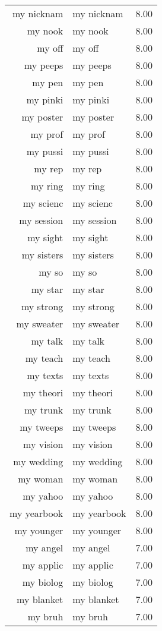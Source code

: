 \begin{table}[ht]
\begin{tabular}{rlr}
  my nicknam & my nicknam & 8.00 \\ 
  my nook & my nook & 8.00 \\ 
  my off & my off & 8.00 \\ 
  my peeps & my peeps & 8.00 \\ 
  my pen & my pen & 8.00 \\ 
  my pinki & my pinki & 8.00 \\ 
  my poster & my poster & 8.00 \\ 
  my prof & my prof & 8.00 \\ 
  my pussi & my pussi & 8.00 \\ 
  my rep & my rep & 8.00 \\ 
  my ring & my ring & 8.00 \\ 
  my scienc & my scienc & 8.00 \\ 
  my session & my session & 8.00 \\ 
  my sight & my sight & 8.00 \\ 
  my sisters & my sisters & 8.00 \\ 
  my so & my so & 8.00 \\ 
  my star & my star & 8.00 \\ 
  my strong & my strong & 8.00 \\ 
  my sweater & my sweater & 8.00 \\ 
  my talk & my talk & 8.00 \\ 
  my teach & my teach & 8.00 \\ 
  my texts & my texts & 8.00 \\ 
  my theori & my theori & 8.00 \\ 
  my trunk & my trunk & 8.00 \\ 
  my tweeps & my tweeps & 8.00 \\ 
  my vision & my vision & 8.00 \\ 
  my wedding & my wedding & 8.00 \\ 
  my woman & my woman & 8.00 \\ 
  my yahoo & my yahoo & 8.00 \\ 
  my yearbook & my yearbook & 8.00 \\ 
  my younger & my younger & 8.00 \\ 
  my angel & my angel & 7.00 \\ 
  my applic & my applic & 7.00 \\ 
  my biolog & my biolog & 7.00 \\ 
  my blanket & my blanket & 7.00 \\ 
  my bruh & my bruh & 7.00 \\ 

\end{tabular}
\end{table}
